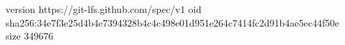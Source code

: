 version https://git-lfs.github.com/spec/v1
oid sha256:34e7f3e25d4b4e7394328b4c4c498e01d951e264c7414fc2d91b4ae5ec44f50e
size 349676
